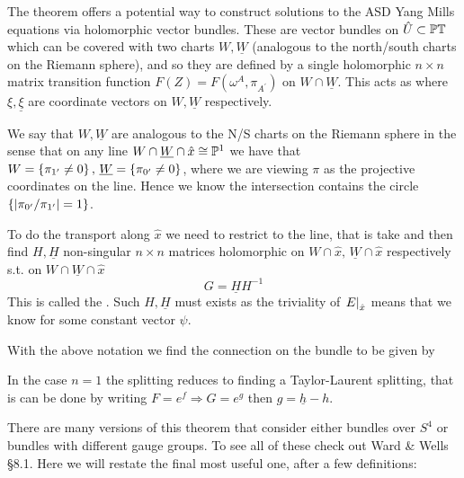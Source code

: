 \documentclass{article}
\begin{document}
The theorem offers a potential way to construct solutions to the ASD Yang Mills equations via holomorphic vector bundles. These are vector bundles on $\hat{U} \subset \mathbb{PT}$ which can be covered with two charts $W, \underline{W}$ (analogous to the north/south charts on the Riemann sphere), and so they are defined by a single holomorphic $n\times n$ matrix transition function $F(Z) = F(\omega^A,\pi_{A^\prime})$ on $W \cap \underline{W}$. This acts as
where $\xi,\underline{\xi}$ are coordinate vectors on $W,\underline{W}$ respectively. 
\begin{remark}
We say that $W,\underline{W}$ are analogous to the N/S charts on the Riemann sphere in the sense that on any line $W \cap \underline{W} \cap \hat{x} \cong \mathbb{P}^1$ we have that $W = \left\{ \pi_{1^\prime} \neq 0 \right\}, \, \underline{W} = \left\{ \pi_{0^\prime} \neq 0 \right\}$, where we are viewing $\pi$ as the projective coordinates on the line. Hence we know the intersection contains the circle $\left\{ \left\lvert \pi_{0^\prime}/\pi_{1^\prime} \right\rvert=1 \right\}$.
\end{remark}
To do the transport along $\hat{x}$ we need to restrict to the line, that is take 
and then find $H, \underline{H}$ non-singular $n\times n$ matrices holomorphic on $W \cap \hat{x}, \, \underline{W} \cap \hat{x}$ respectively s.t. on $W \cap \underline{W} \cap \hat{x}$  
\begin{equation}\label{eq:splitting formula}
G = \underline{H} H^{-1} 
\end{equation}
This is called the . Such $H,\underline{H}$ must exists as the triviality of $\left. E \right\rvert_{\hat{x}}$ means that we know 
for some constant vector $\psi$. 
\begin{prop}
	With the above notation we find the connection on the bundle to be given by 
\end{prop}

\begin{example}\label{ex:splitting formula abelian case}
	In the case $n=1$ the splitting reduces to finding a Taylor-Laurent splitting, that is can be done by writing $F = e^f \Rightarrow G = e^g$ then $g = \underline{h} -h$. 
\end{example}

There are many versions of this theorem that consider either bundles over $S^4$ or bundles with different gauge groups. To see all of these check out Ward \& Wells \S 8.1. Here we will restate the final most useful one, after a few definitions:
\end{document}
